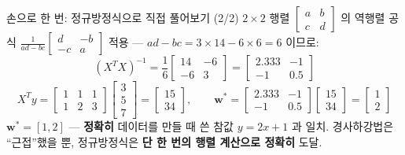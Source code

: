 \begin{frame}{손으로 한 번: 정규방정식으로 직접 풀어보기 (2/2)}
  $2 \times 2$ 행렬 $\begin{bmatrix}a&b\\c&d\end{bmatrix}$ 의
  역행렬 공식 $\frac{1}{ad-bc}\begin{bmatrix}d&-b\\-c&a\end{bmatrix}$
  적용 --- $ad-bc = 3\times14-6\times6 = 6$ 이므로:
  \[
  (X^TX)^{-1} = \frac{1}{6}\begin{bmatrix}14&-6\\-6&3\end{bmatrix}
  = \begin{bmatrix}2.333&-1\\-1&0.5\end{bmatrix}
  \]
  \[
  X^Ty = \begin{bmatrix}1&1&1\\1&2&3\end{bmatrix}
  \begin{bmatrix}3\\5\\7\end{bmatrix}
  = \begin{bmatrix}15\\34\end{bmatrix}, \hspace{2em}
  \boldsymbol{w}^{*} = \begin{bmatrix}2.333&-1\\-1&0.5\end{bmatrix}
  \begin{bmatrix}15\\34\end{bmatrix}
  = \begin{bmatrix}1\\2\end{bmatrix}
  \]
  $\boldsymbol{w}^{*} = [1, 2]$ --- \textbf{정확히} 데이터를 만들 때 쓴 참값
  $y = 2x+1$ 과 일치. 경사하강법은 ``근접''했을 뿐, 정규방정식은
  \textbf{단 한 번의 행렬 계산으로 정확히} 도달.
\end{frame}
